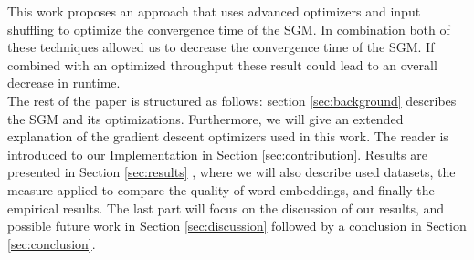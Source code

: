  This work proposes an approach that uses advanced optimizers and input shuffling to optimize the convergence time of the SGM. In combination both of these techniques allowed us to decrease the convergence time of the SGM. If combined with an optimized throughput these result could lead to an overall decrease in runtime.\\
 The rest of the paper  is structured as follows: section \ref{sec:background}  describes the SGM and its optimizations. Furthermore, we will give an extended explanation of the gradient descent optimizers used in this work. The reader is introduced to our Implementation in Section \ref{sec:contribution}. Results are presented in  Section \ref{sec:results} , where we will also describe used datasets, the measure applied to compare the quality of word embeddings, and finally the empirical results. The last part will focus on the discussion of our results, and possible future work in Section \ref{sec:discussion} followed by a conclusion in Section \ref{sec:conclusion}.